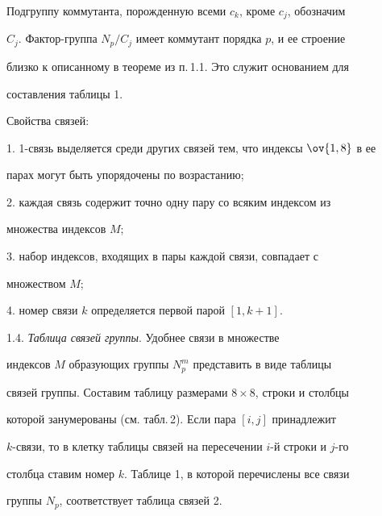 \smallskip





Подгруппу коммутанта, порожденную всеми $c_k$, кроме $c_j$, обозначим


$C_j$. Фактор-группа $N_p/C_j$ имеет коммутант порядка $p$, и ее строение


близко к описанному в теореме из п.\,1.1. Это служит основанием для


составления таблицы 1.





Свойства связей:





1. 1-связь выделяется среди других связей тем, что индексы $\ov{1,8}$ в ее


парах могут быть упорядочены по возрастанию;





2. каждая связь содержит точно одну пару со всяким индексом из


множества индексов $M$;





3. набор индексов, входящих в пары каждой связи, совпадает с 


множеством $M$;





4. номер связи $k$ определяется первой парой $[1,k+1]$.


\medskip





1.4. {\it Таблица связей группы}. Удобнее связи в множестве


индексов $M$ образующих группы $N^m_p$ представить в виде таблицы


связей группы. Составим таблицу размерами $8\times 8$, строки и столбцы


которой занумерованы (см. табл.\,2). Если пара $[i,j]$ принадлежит


$k$-связи, то в клетку таблицы связей на пересечении $i$-й строки и $j$-го


столбца ставим номер $k$. Таблице 1, в которой перечислены все связи


группы $N_p$, соответствует таблица связей 2.


\smallskip





